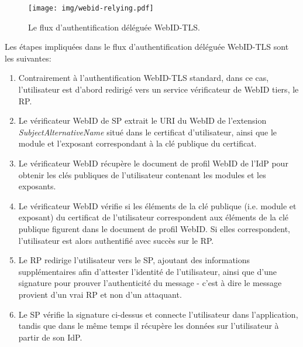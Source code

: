 \begin{figure}[h]
  \begin{center}
    \texttt{[image: img/webid-relying.pdf]}
        \caption{Le flux d'authentification déléguée WebID-TLS.}
        \label{fig:webid-relying-fr}
  \end{center}
\end{figure}

Les étapes impliquées dans le flux d'authentification déléguée WebID-TLS sont les suivantes:\\

\begin{enumerate}
\item Contrairement à l'authentification WebID-TLS standard, dans ce cas, l'utilisateur est d'abord redirigé vers un service vérificateur de WebID tiers, le RP.
\item Le vérificateur WebID de SP extrait le URI du WebID de l'extension \textit{SubjectAlternativeName} situé dans le certificat d'utilisateur, ainsi que le module et l'exposant correspondant à la clé publique du certificat.
\item Le vérificateur WebID récupère le document de profil WebID de l'IdP pour obtenir les clés publiques de l'utilisateur contenant les modules et les exposants.
\item Le vérificateur WebID vérifie si les éléments de la clé publique (i.e. module et exposant) du certificat de l'utilisateur correspondent aux éléments de la clé publique figurent dans le document de profil WebID. Si elles correspondent, l'utilisateur est alors authentifié avec succès sur le RP.
\item Le RP redirige l'utilisateur vers le SP, ajoutant des informations supplémentaires afin d'attester l'identité de l'utilisateur, ainsi que d'une signature pour prouver l'authenticité du message - c'est à dire le message provient d'un vrai RP et non d'un attaquant.
\item Le SP vérifie la signature ci-dessus et connecte l'utilisateur dans l'application, tandis que dans le même temps il récupère les données sur l'utilisateur à partir de son IdP.
\end{enumerate}

